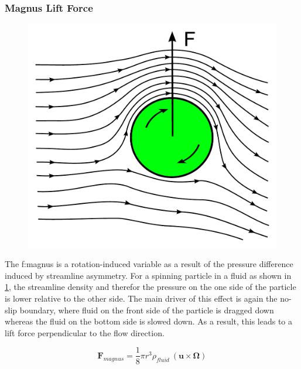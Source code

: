 \subsubsection{Magnus Lift Force}
\vspace{\baselineskip}
\begin{figure}[h!]
	\centering
	\includegraphics[width=0.6\linewidth]{./Ressources/Fluidic/Magnus-effect.pdf}
	\label{fig:fluidic:magnus}
\end{figure}
The \gls{f:magnus} is a rotation-induced variable as a result of the pressure difference induced by streamline asymmetry.\cite{lit:fluidic:inertialFluidicsForces} For a spinning particle in a fluid as shown in \cref{fig:fluidic:magnus}, the streamline density and therefor the pressure on the one side of the particle is lower relative to the other side. The main driver of this effect is again the no-slip boundary, where fluid on the front side of the particle is dragged down whereas the fluid on the bottom side is slowed down. As a result, this leads to a lift force perpendicular to the flow direction.

\begin{equation}	
	\mathbf{F}_{magnus} =  \frac{1}{8}\pi r^3 \rho_{fluid} \ ( \mathbf{u} \times \mathbf{\Omega}) \label{eq:f:magnus}
\end{equation}



